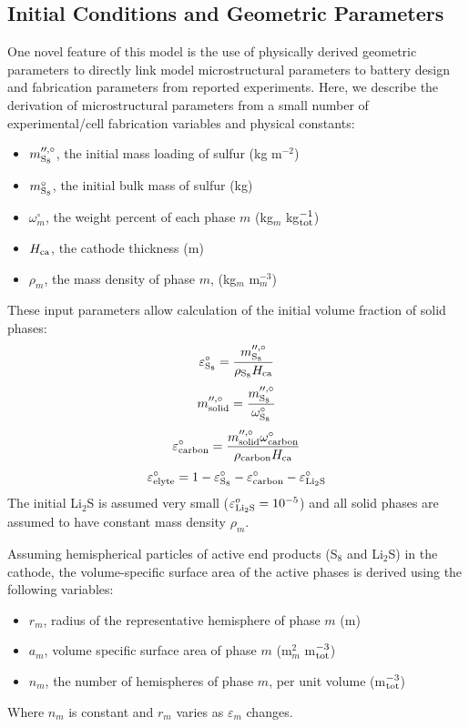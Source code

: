 \documentclass{elsarticle}
\begin{document}
\subsection{Initial Conditions and Geometric Parameters}
One novel feature of this model is the use of physically derived geometric parameters to directly link model microstructural parameters to  battery design and fabrication parameters from reported experiments. Here, we describe the derivation of  microstructural parameters from a small number of experimental/cell fabrication variables and physical constants:
\begin{itemize}
    \item $m^{\prime\prime,\circ}_{\rm S_8}$, the initial mass loading of sulfur (kg m$^{-2}$)
    \item $m^\circ_{\rm S_8}$, the initial bulk mass of sulfur (kg)
    \item $\omega^\circ_m$, the weight percent of each phase $m$ (kg$_m$ kg$^{-1}_{\rm tot}$)
    \item $H_{\rm ca}$, the cathode thickness (m)
    \item $\rho_m$, the mass density of phase $m$, (kg$_m$ m$^{-3}_m$)
\end{itemize}
These input parameters allow calculation of the initial volume fraction of solid phases:
\begin{equation}\label{eq:esp_S8_o}
    \varepsilon_{\rm S_8}^\circ = \frac{m^{\prime\prime,\circ}_{\rm S_8}}{\rho_{\rm S_8} H_{\rm ca}}
\end{equation}
\begin{equation}\label{eq:m_solid_o}
    m^{\prime\prime,\circ}_{\rm solid} = \frac{m^{\prime\prime,\circ}_{\rm S_8}}{\omega^\circ_{\rm S_8}}
\end{equation}
\begin{equation}\label{eq:eps_carbon_o}
    \varepsilon^\circ_{\rm carbon} = \frac{ m^{\prime\prime,\circ}_{\rm solid}\omega^\circ_{\rm carbon}}{\rho_{\rm carbon}H_{\rm ca}}
\end{equation}
\begin{equation}\label{eq:eps_elyte_o}
    \varepsilon^\circ_{\rm elyte} = 1 - \varepsilon^\circ_{\rm S_8} - \varepsilon^\circ_{\rm carbon} - \varepsilon^\circ_{\rm Li_2S}
\end{equation}
The initial Li$_2$S is assumed very small ($\varepsilon^{o}_{\rm{Li}_2\rm{S}} = 10^{-5}$) and all solid phases are assumed to have constant mass density $\rho_m$.

Assuming hemispherical particles of active end products (S$_8$ and Li$_2$S) in the cathode, the volume-specific surface area of the active phases is derived using the following variables:
\begin{itemize}
    \item $r_m$, radius of the representative hemisphere of phase $m$ (m)
    \item $a_m$, volume specific surface area of phase $m$ (m$^2_m$ m$^{-3}_{\rm tot}$)
    \item $n_m$, the number of hemispheres of phase $m$, per unit volume (m$^{-3}_{\rm tot}$)
\end{itemize}
Where $n_m$ is constant and $r_m$ varies as $\varepsilon_m$ changes.
\end{document}
